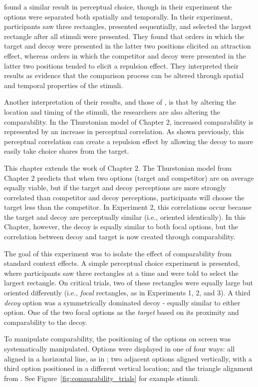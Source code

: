 \textcite{evansImpactPresentationOrder2021} found a similar result in perceptual choice, though in their experiment the options were separated both spatially and temporally. In their experiment, participants saw three rectangles, presented sequentially, and selected the largest rectangle after all stimuli were presented. They found that orders in which the target and decoy were presented in the latter two positions elicited an attraction effect, whereas orders in which the competitor and decoy were presented in the latter two positions tended to elicit a repulsion effect. They interpreted their results as evidence that the comparison process can be altered through spatial and temporal properties of the stimuli.

Another interpretation of their results, and those of \textcite{trueblood2022attentional}, is that by altering the location and timing of the stimuli, the researchers are also altering the comparability. In the Thurstonian model of Chapter 2, increased comparability is represented by an increase in perceptual correlation. As shown previously, this perceptual correlation can create a repulsion effect by allowing the decoy to more easily take choice shares from the target.

This chapter extends the work of Chapter 2. The Thurstonian model from Chapter 2 predicts that when two options (target and competitor) are on average equally viable, but if the target and decoy perceptions are more strongly correlated than competitor and decoy perceptions, participants will choose the target less than the competitor. In Experiment 2, this correlations occur because the target and decoy are perceptually similar (i.e., oriented identically). In this Chapter, however, the decoy is equally similar to both focal options, but the correlation between decoy and target is now created through comparability.

The goal of this experiment was to isolate the effect of comparability from standard context effects. A simple perceptual choice experiment is presented, where participants saw three rectangles at a time and were told to select the largect rectangle. On critical trials, two of these rectangles were equally large but oriented differently (i.e., \textit{focal} rectangles, as in Experiments 1, 2, and 3). A third \textit{decoy} option was a symmetrically dominated decoy - equally similar to either option. One of the two focal options as the \textit{target} based on its proximity and comparability to the decoy. 

To manipulate comparability, the positioning of the options on screen was systematically manipulated. Options were displayed in one of four ways: all aligned in a horizontal line, as in \textcite{trueblood2013not}; two adjacent options aligned vertically, with a third option positioned in a different vertical location; and the triangle alignment from \textcite{spektorWhenGoodLooks2018b}. See Figure~\ref{fig:comparability_trials} for example stimuli.

